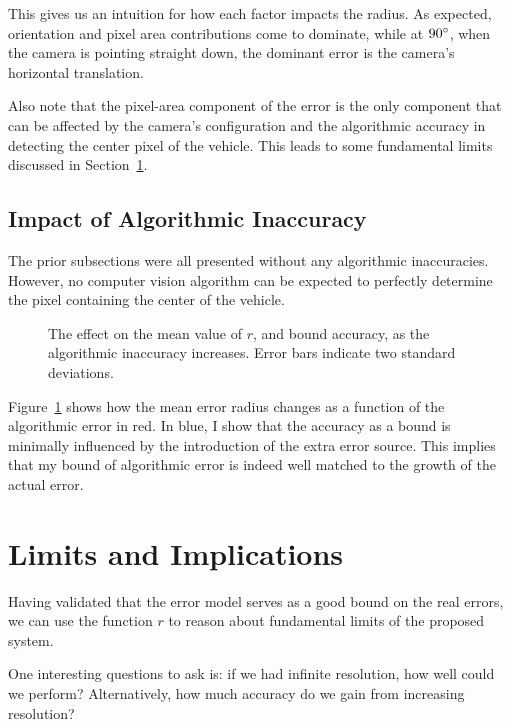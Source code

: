 \documentclass[a4paper,12pt,twoside,openright]{report}
\begin{document}
This gives us an intuition for how each factor impacts the radius.
As expected, orientation and pixel area contributions
come to dominate, while at $90\degree$, when the camera is pointing straight down, the dominant
error is the camera's horizontal translation.

Also note that the pixel-area component of the error is the only component that
can be affected by the camera's configuration and the algorithmic 
accuracy in detecting the center pixel of the vehicle. This leads
to some fundamental limits discussed in Section~\ref{sec:camera:implications}.

\subsection{Impact of Algorithmic Inaccuracy}

The prior subsections were all presented without any algorithmic inaccuracies.
However, no computer vision algorithm can be expected to perfectly determine
the pixel containing the center of the vehicle.

\begin{figure}[htb]
    \begin{center}
        
    \end{center}
    \caption[Effect of Algorithmic Inaccuracy]{The effect on the mean value of $r$, and bound accuracy, as the algorithmic inaccuracy increases. Error bars indicate two standard deviations.}
    \label{fig:camera:algorithm effect}
\end{figure}


Figure~\ref{fig:camera:algorithm effect} shows how the mean error radius changes as a function of the 
algorithmic error in red. In blue, I show that the accuracy as a bound is minimally influenced 
by the introduction of the extra error source. This implies that my bound of
algorithmic error is indeed well matched to the growth of the actual error.


\section{Limits and Implications}
\label{sec:camera:implications}

Having validated that the error model serves as a good bound on the real errors, we can use the function $r$
to reason about fundamental limits of the proposed system.

One interesting questions to ask is: if we had infinite resolution,
how well could we perform? Alternatively, how much accuracy do we gain from increasing resolution?
\end{document}
